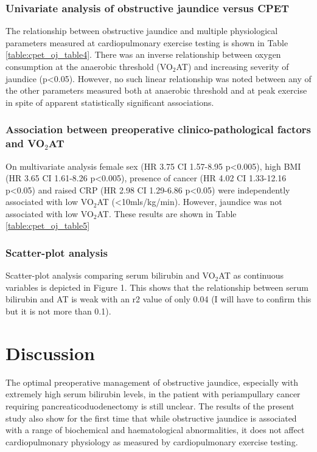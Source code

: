 

\subsubsection{Univariate analysis of obstructive jaundice versus CPET}
The relationship between obstructive jaundice and multiple physiological parameters measured at cardiopulmonary exercise testing is shown in Table \ref{table:cpet_oj_table4}. There was an inverse relationship between oxygen consumption at the anaerobic threshold (VO$_2$AT) and increasing severity of jaundice (p<0.05). However, no such linear relationship was noted between any of the other parameters measured both at anaerobic threshold and at peak exercise in spite of apparent statistically significant associations.



\subsubsection{Association between preoperative clinico-pathological factors and VO$_2$AT}
On multivariate analysis female sex (HR 3.75 CI 1.57-8.95 p<0.005), high BMI (HR 3.65 CI 1.61-8.26 p<0.005), presence of cancer (HR 4.02 CI 1.33-12.16 p<0.05) and raised CRP (HR 2.98 CI 1.29-6.86 p<0.05) were independently associated with low VO$_2$AT (<10mls/kg/min). However, jaundice was not associated with low VO$_2$AT. These results are shown in Table \ref{table:cpet_oj_table5}



\subsubsection{Scatter-plot analysis}
Scatter-plot analysis comparing serum bilirubin and VO$_2$AT as continuous variables is depicted in Figure 1. This shows that the relationship between serum bilirubin and AT is weak with an r2 value of only 0.04 (I will have to confirm this but it is not more than 0.1). 

\clearpage

\section{Discussion}
The optimal preoperative management of obstructive jaundice, especially with extremely high serum bilirubin levels, in the patient with periampullary cancer requiring pancreaticoduodenectomy is still unclear. The results of the present study also show for the first time that while obstructive jaundice is associated with a range of biochemical and haematological abnormalities, it does not affect cardiopulmonary physiology as measured by cardiopulmonary exercise testing. 

